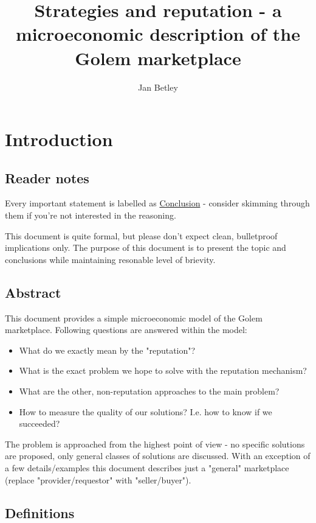 \documentclass{article}
\title{Strategies and reputation - a microeconomic description of the Golem marketplace}
\author{Jan Betley}
\begin{document}
\maketitle
\section{Introduction}
\subsection{Reader notes}

Every important statement is labelled as \underline{Conclusion} - consider skimming through them if you're not interested in the reasoning.

This document is quite formal, but please don't expect clean, bulletproof implications only. The purpose of this document is to
present the topic and conclusions while maintaining resonable level of brievity.

\subsection{Abstract}
This document provides a simple microeconomic model of the Golem marketplace. 
Following questions are answered within the model:

\begin{itemize}
\item What do we exactly mean by the "reputation"?
\item What is the exact problem we hope to solve with the reputation mechanism?
\item What are the other, non-reputation approaches to the main problem?
\item How to measure the quality of our solutions? I.e. how to know if we succeeded?
\end{itemize}


The problem is approached from the highest point of view - no specific solutions are proposed, only general classes of solutions are discussed.
With an exception of a few details/examples this document describes just a "general" marketplace (replace "provider/requestor" with "seller/buyer").

\subsection{Definitions}
\end{document}

